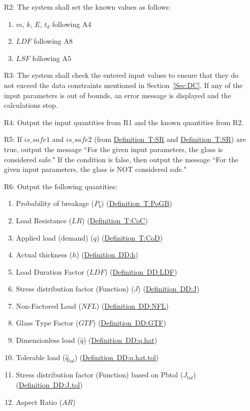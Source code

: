 \documentclass[12pt]{article}
\begin{document}
\begin{itemize}
\item[R2:]The system shall set the known values as follows: 
          \begin{enumerate}
          \item{$m$, $k$, $E$, $t_{d}$ following A4}
          \item{$LDF$ following A8}
          \item{$LSF$ following A5}
          \end{enumerate}
\item[R3:]The system shall check the entered input values to ensure that they do not exceed the data constraints mentioned in Section~\ref{Sec:DC}. If any of the input parameters is out of bounds, an error message is displayed and the calculations stop.
\item[R4:]Output the input quantities from R1 and the known quantities from R2.
\item[R5:]If $is\_safe1$ and $is\_safe2$ (from \hyperref[T:SR]{Definition~T:SR} and \hyperref[T:SR]{Definition~T:SR}) are true, output the message ``For the given input parameters, the glass is considered safe." If the condition is false, then output the message ``For the given input parameters, the glass is NOT considered safe."
\item[R6:]Output the following quantities:
          \begin{enumerate}
          \item{Probability of breakage ($P_{b}$) (\hyperref[T:PoGB]{Definition~T:PoGB})}
          \item{Load Resistance ($LR$) (\hyperref[T:CoC]{Definition~T:CoC})}
          \item{Applied load (demand) ($q$) (\hyperref[T:CoD]{Definition~T:CoD})}
          \item{Actual thickness ($h$) (\hyperref[DD:h]{Definition~DD:h})}
          \item{Load Duration Factor ($LDF$) (\hyperref[DD:LDF]{Definition~DD:LDF})}
          \item{Stress distribution factor (Function) ($J$) (\hyperref[DD:J]{Definition~DD:J})}
          \item{Non-Factored Load ($NFL$) (\hyperref[DD:NFL]{Definition~DD:NFL})}
          \item{Glass Type Factor ($GTF$) (\hyperref[DD:GTF]{Definition~DD:GTF})}
          \item{Dimensionless load ($\hat{q}$) (\hyperref[DD:q.hat]{Definition~DD:q.hat})}
          \item{Tolerable load ($\hat{q}_{tol}$) (\hyperref[DD:q.hat.tol]{Definition~DD:q.hat.tol})}
          \item{Stress distribution factor (Function) based on Pbtol ($J_{tol}$) (\hyperref[DD:J.tol]{Definition~DD:J.tol})}
          \item{Aspect Ratio ($AR$)}
          \end{enumerate}
\end{itemize}
\end{document}
